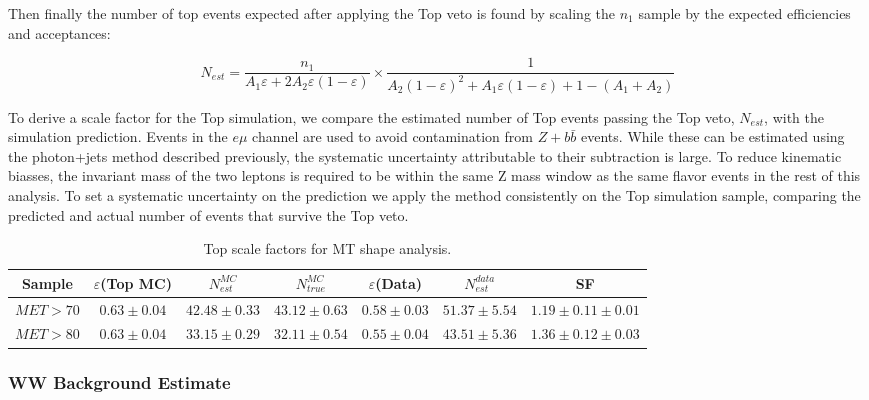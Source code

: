 Then finally the number of top events expected after applying the Top veto is found
by scaling the $n_{1}$ sample by the expected efficiencies and acceptances:

\begin{equation}
\label{eqn:topVetoYieldEst}
N_{est} = \frac{n_{1}} {A_{1}\varepsilon + 2A_{2}\varepsilon(1-\varepsilon)} \times \frac{1}{A_{2}(1-\varepsilon)^2 + A_{1}\varepsilon(1-\varepsilon) + 1-(A_{1}+A_{2})}
\end{equation}

To derive a scale factor for the Top simulation, we compare the estimated number of Top events
passing the Top veto, $N_{est}$, with the simulation prediction.
Events in the $e\mu$ channel are used to avoid contamination from $Z+b\bar{b}$ events.
While these can be estimated using the photon+jets method described previously,
the systematic uncertainty attributable to their subtraction is large.
To reduce kinematic biasses, the invariant mass of the two leptons is 
required to be within the same Z mass window as the same flavor events 
in the rest of this analysis.
To set a systematic uncertainty on the prediction we apply the method
consistently on the Top simulation sample, comparing the predicted and
actual number of events that survive the Top veto.

\begin{table}[!ht]
\begin{center}
\small{
\begin{tabular}{c|c|c|c|c|c|c}
\hline
Sample & $\varepsilon$(Top MC) & $N_{est}^{MC}$ & $N_{true}^{MC}$ & $\varepsilon$(Data) & $N_{est}^{data}$ & SF \\ \hline
$MET>70$  &  $0.63 \pm 0.04$  &  $42.48 \pm 0.33$  &  $43.12 \pm 0.63$  &  $0.58 \pm 0.03$  &  $51.37 \pm 5.54$  &  $1.19 \pm 0.11 \pm 0.01$ \\ \hline
$MET>80$  &  $0.63 \pm 0.04$  &  $33.15 \pm 0.29$  &  $32.11 \pm 0.54$  &  $0.55 \pm 0.04$  &  $43.51 \pm 5.36$  &  $1.36 \pm 0.12 \pm 0.03$ \\ \hline
\end{tabular}
\caption{Top scale factors for MT shape analysis.}
\label{tab:top_sf}}
\end{center}
\end{table}

\subsubsection{WW Background Estimate}

